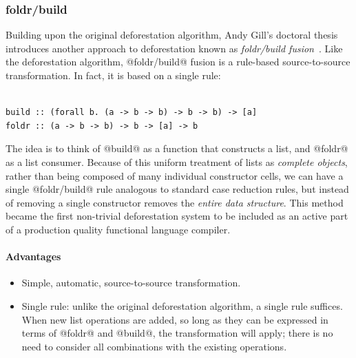 \subsubsection{foldr/build}

Building upon the original deforestation algorithm, Andy Gill's doctoral thesis
introduces another approach to deforestation known as \emph{foldr/build
fusion}~\cite{Gill:1996tf,Gill:1993de}.
Like the deforestation algorithm, @foldr/build@ fusion is a rule-based
source-to-source transformation. In fact, it is based on a single rule:
%
\begin{lstlisting}[style=Haskell,numbers=none,mathescape,caption={The @foldr/build@ transformation}]
%\bf$\langle$ foldr/build fusion $\rangle$% forall g k z. foldr k z (build g) $\mapsto$ g k z

build :: (forall b. (a -> b -> b) -> b -> b) -> [a]
foldr :: (a -> b -> b) -> b -> [a] -> b
\end{lstlisting}

The idea is to think of @build@ as a function that constructs a list, and
@foldr@ as a list consumer. Because of this uniform treatment of lists as
\emph{complete objects}, rather than being composed of many individual
constructor cells, we can have a single @foldr/build@ rule analogous to
standard case reduction rules, but instead of removing a single constructor
removes the \emph{entire data structure}. This method became the first
non-trivial deforestation system to be included as an active part of a
production quality functional language compiler.

\paragraph{Advantages}
\begin{itemize}
    \item Simple, automatic, source-to-source transformation.


    \item Single rule: unlike the original deforestation algorithm, a single
        rule suffices. When new list operations are added, so long as they can
        be expressed in terms of @foldr@ and @build@, the
        transformation will apply; there is no need to consider all combinations
        with the existing operations.
\end{itemize}

